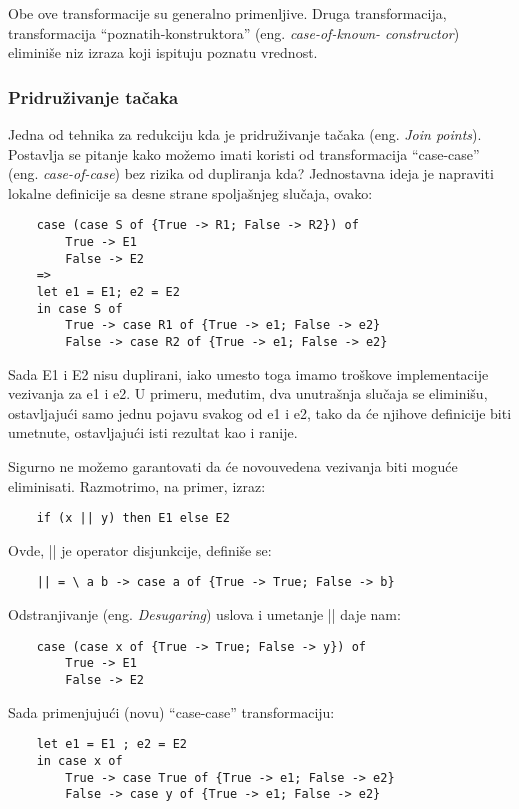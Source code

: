 Obe ove transformacije su generalno primenljive. Druga transformacija, transformacija “poznatih-konstruktora” (eng. \emph{case-of-known-
constructor}) eliminiše niz izraza koji ispituju poznatu vrednost.

\subsubsection {Pridruživanje tačaka}
\label{sec:podpodnaslovJoin}

Jedna od tehnika za redukciju kda je pridruživanje tačaka (eng. \emph{Join points}). Postavlja se pitanje kako možemo imati koristi od transformacija “case-case” (eng. \emph{case-of-case}) bez rizika od dupliranja kda? Jednostavna ideja je napraviti lokalne definicije sa desne strane spoljašnjeg slučaja, ovako:
\begin{verbatim}
	case (case S of {True -> R1; False -> R2}) of
		True -> E1
		False -> E2
	=>
	let e1 = E1; e2 = E2
	in case S of
		True -> case R1 of {True -> e1; False -> e2}
		False -> case R2 of {True -> e1; False -> e2}
\end{verbatim}

Sada E1 i E2 nisu duplirani, iako umesto toga imamo troškove implementacije vezivanja za e1 i e2. U primeru, međutim, dva unutrašnja slučaja se eliminišu, ostavljajući samo jednu pojavu svakog od e1 i e2, tako da će njihove definicije biti umetnute, ostavljajući isti rezultat kao i ranije.

Sigurno ne možemo garantovati da će novouvedena vezivanja biti moguće eliminisati. Razmotrimo, na primer, izraz:
\begin{verbatim}
	if (x || y) then E1 else E2
\end{verbatim}
Ovde, || je operator disjunkcije, definiše se:
\begin{verbatim}
	|| = \ a b -> case a of {True -> True; False -> b}
\end{verbatim}

Odstranjivanje (eng. \emph{Desugaring}) uslova i umetanje || daje nam:
\begin{verbatim}
	case (case x of {True -> True; False -> y}) of
		True -> E1
		False -> E2
\end{verbatim}

Sada primenjujući (novu) “case-case” transformaciju:
\begin{verbatim}
	let e1 = E1 ; e2 = E2
	in case x of
		True -> case True of {True -> e1; False -> e2}
		False -> case y of {True -> e1; False -> e2}
\end{verbatim}

